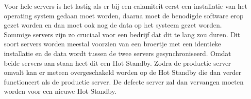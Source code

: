 Voor hele servers is het lastig als er bij een calamiteit eerst een installatie van het operating system gedaan moet worden, daarna moet de benodigde software erop gezet worden en dan moet ook nog de data op het systeem gezet worden. Sommige servers zijn zo cruciaal voor een bedrijf dat dit te lang zou duren. Dit soort servers worden meestal voorzien van een broertje met een identieke installatie en de data wordt tussen de twee servers gesynchroniseerd. Omdat beide servers aan staan heet dit een Hot Standby. Zodra de productie server omvalt kan er meteen overgeschakeld worden op de Hot Standby die dan verder functioneert als de productie server. De defecte server zal dan vervangen moeten worden voor een nieuwe Hot Standby.

